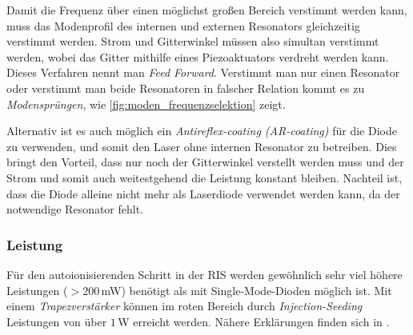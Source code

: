 Damit die Frequenz über einen möglichst großen Bereich verstimmt werden kann,
muss das Modenprofil des internen und externen Resonators gleichzeitig verstimmt
werden. Strom und Gitterwinkel müssen also simultan verstimmt werden, wobei das
Gitter mithilfe eines Piezoaktuators verdreht werden kann. Dieses Verfahren
nennt man \textit{Feed Forward}. Verstimmt man nur einen Resonator oder verstimmt
man beide Resonatoren in falscher Relation kommt es zu
\textit{Modensprüngen}, wie
\ref{fig:moden_frequenzselektion} zeigt.\par Alternativ ist es auch möglich ein \textit{Antireflex-coating (AR-coating)} für
die Diode zu verwenden, und somit den Laser ohne internen Resonator zu
betreiben.
Dies bringt den Vorteil, dass nur noch der Gitterwinkel verstellt werden muss
und der Strom und somit auch weitestgehend die Leistung konstant bleiben.
Nachteil ist, dass die Diode alleine nicht mehr als Laserdiode verwendet werden kann, da
der notwendige Resonator fehlt.

\subsubsection{Leistung}\label{subsubsec:diodenlaser_leistung}
Für den autoionisierenden Schritt in der RIS werden gewöhnlich sehr viel höhere
Leistungen ($>200\,$mW) benötigt als mit Single-Mode-Dioden möglich ist. Mit
einem \textit{Trapezverstärker} können im roten Bereich durch
\textit{Injection-Seeding} Leistungen von über $1\,$W erreicht werden. Nähere
Erklärungen finden sich in \cite{schumann:2001:diplomarbeit}.